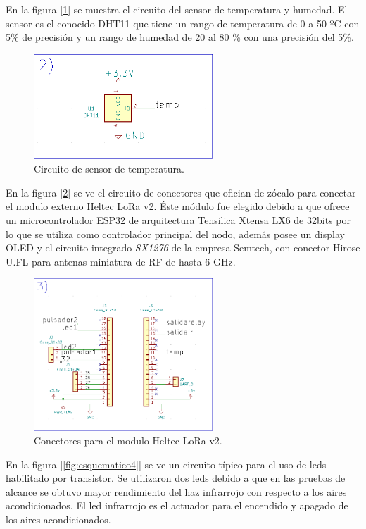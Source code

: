 En la figura [\ref{fig:esquematico2}] se muestra el circuito del sensor de temperatura y humedad. El sensor es el conocido DHT11 que tiene un rango de temperatura de 0 a 50 ºC con 5\% de precisión y un rango de humedad de 20 al 80 \% con una precisión del 5\%.

\begin{figure}[h!]
	\centering
	\includegraphics[width=0.6\textwidth]{./Figures/esquematico2.png}
	\caption{Circuito de sensor de temperatura.}
	\label{fig:esquematico2}
\end{figure}

En la figura [\ref{fig:esquematico3}] se ve el circuito de conectores que ofician de zócalo para conectar el modulo externo Heltec LoRa v2. Éste módulo fue elegido debido a que ofrece un microcontrolador ESP32 de arquitectura Tensilica Xtensa LX6 de 32bits por lo que se utiliza como controlador principal del nodo, además posee un display OLED y el circuito integrado {\textit{SX1276}} de la empresa Semtech, con conector Hirose U.FL para antenas miniatura de RF de hasta 6 GHz.

\begin{figure}[h!]
	\centering
	\includegraphics[width=0.6\textwidth]{./Figures/esquematico3.png}
	\caption{Conectores para el modulo Heltec LoRa v2.}
	\label{fig:esquematico3}
\end{figure}

En la figura [\ref{fig:esquematico4}] se ve un circuito típico para el uso de leds habilitado por transistor. Se utilizaron dos leds debido a que en las pruebas de alcance se obtuvo mayor rendimiento del haz infrarrojo con respecto a los aires acondicionados. El led infrarrojo es el actuador para el encendido y apagado de los aires acondicionados.

